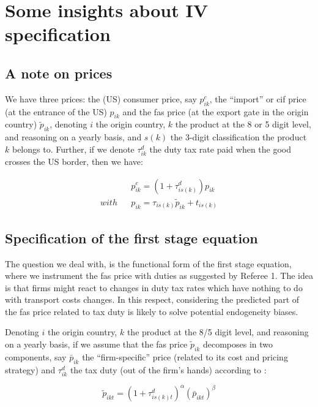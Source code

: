 \documentclass[11pt,twoside, authoryear]{elsarticle}
\begin{document}
\section{Some insights about IV specification}

\subsection{A note on prices}

We have three prices: the (US) consumer price, say $p^{c}_{ik}$, the ``import'' or  cif price (at the entrance of the US) $p_{ik}$ and the fas price (at the export gate in the origin country) $\widetilde{p}_{ik}$, denoting $i$ the origin country, $k$ the product at the 8 or 5 digit level, and reasoning on a yearly basis, and $s(k)$ the 3-digit classification the product $k$ belongs to. Further, if we denote $\tau^d_{ik}$ the duty tax rate paid when the good crosses the US border, then we have:

\begin{eqnarray*}
&&p^c_{ik} = (1+\tau^d_{is(k)})p_{ik} \\
with && p_{ik}  = \tau_{is(k)} \widetilde{p}_{ik} +t_{is(k)}
\end{eqnarray*}



\subsection{Specification of the first stage equation}


The question we deal with, is the functional form of the first stage equation, where we instrument the fas price with duties as suggested by Referee 1. The idea is that firms might react to changes in duty tax rates which have nothing to do with transport costs changes. In this respect, considering the predicted part of the fas price related to tax duty is likely to solve potential endogeneity biases.

Denoting $i$ the origin country, $k$ the product at the 8/5 digit level, and reasoning on a yearly basis, if we assume that the fas price $\widetilde{p}_{ik}$ decomposes in two components, say $\bar{p}_{ik}$ the ``firm-specific'' price (related to its cost and pricing strategy) and $\tau^d_{ik}$ the tax duty (out of the firm's hands) according to :

\begin{equation}
\widetilde{p}_{ikt} = (1+\tau^d_{is(k)t})^\alpha \left(\bar{p}_{ikt}\right)^\beta \label{eq:link_fas_duty}
\end{equation}
\end{document}
